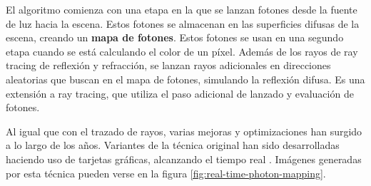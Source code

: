 El algoritmo comienza con una etapa en la que se lanzan fotones desde la fuente de luz hacia la escena.
Estos fotones se almacenan en las superficies difusas de la escena, creando un \textbf{mapa de fotones}.
Estos fotones se usan en una segundo etapa cuando se está calculando el color de un píxel.
Además de los rayos de ray tracing de reflexión y refracción, se lanzan rayos adicionales en direcciones aleatorias que buscan en el mapa de fotones, simulando la reflexión difusa.
Es una extensión a ray tracing, que utiliza el paso adicional de lanzado y evaluación de fotones.

Al igual que con el trazado de rayos, varias mejoras y optimizaciones han surgido a lo largo de los años.
Variantes de la técnica original han sido desarrolladas haciendo uso de tarjetas gráficas, alcanzando el tiempo real \cite{real-time-photon-mapping}.
Imágenes generadas por esta técnica pueden verse en la figura \ref{fig:real-time-photon-mapping}.

